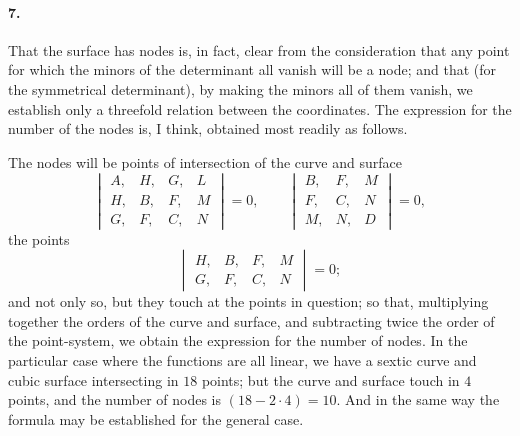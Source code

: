 \documentclass[11pt,a4paper]{article}
\begin{document}
\paragraph{7.}
That the surface has nodes is, in fact, clear from the consideration that any point for
which the minors of the determinant all vanish will be a node; and that (for the symmetrical
determinant), by making the minors all of them vanish, we establish only a threefold
relation between the coordinates. The expression for the number of the nodes is, I think,
obtained most readily as follows.

The nodes will be points of intersection of the curve and surface
\[
\begin{vmatrix}
A, & H, & G, & L \\
H, & B, & F, & M \\
G, & F, & C, & N
\end{vmatrix} = 0,
\qquad
\begin{vmatrix}
B, & F, & M \\
F, & C, & N \\
M, & N, & D
\end{vmatrix} = 0,
\]
the points
\[
\begin{vmatrix}
H, & B, & F, & M \\
G, & F, & C, & N
\end{vmatrix} = 0;
\]
and not only so, but they touch at the points in question; so that, multiplying together
the orders of the curve and surface, and subtracting twice the order of the point-system,
we obtain the expression for the number of nodes. In the particular case where the
functions are all linear, we have a sextic curve and cubic surface intersecting in $18$
points; but the curve and surface touch in $4$ points, and the number of nodes is
$(18 - 2 \cdot 4) = 10$. And in the same way the formula may be established for the
general case.
\end{document}
